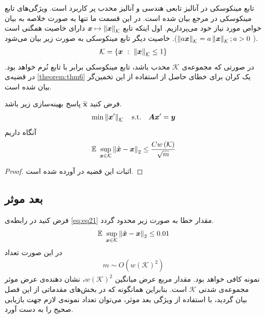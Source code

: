 تابع مینکوسکی در آنالیز تابعی هندسی و آنالیز محدب پر کاربرد است. ویژگی‌های تابع مینکوسکی در مرجع 
\cite{rockafellar1970convex}
بیان شده است. در این قسمت ما تنها به صورت خلاصه به بیان خواص مورد نیاز خود می‌پردازیم. اول اینکه تابع
$\bm{x}\mapsto \left\lVert\bm{x}\right\rVert_{\mathcal{K}}$
دارای خاصیت همگنی است (
$\left\lVert a\bm{x}\right\rVert_{\mathcal{K}} = a \left\lVert\bm{x}\right\rVert_{\mathcal{K}}; a>0$).
خاصیت دیگر تابع مینکوسکی
به صورت زیر بیان می‌شود.
\begin{align}
\label{eq:eq19}
\mathcal{K}= \lbrace \bm{x}~:~ \left\lVert\bm{x}\right\rVert_{\mathcal{K}}\leq 1 \rbrace
\end{align}
در صورتی که مجموعه‌ی
$\mathcal{K}$
محدب باشد، تابع مینکوسکی
برابر با تابع نُرم خواهد بود. در قضیه‌ی
\eqref{theorem:thm6}
یک کران برای خطای حاصل از استفاده از این تخمین‌گر بیان شده است.
\begin{theorem}
\label{theorem:thm6}
\cite[قضیه~ ۴.۲]{vershynin2015estimation}
فرض کنید
$\hat{\bm{x}}$
پاسخ بهینه‌سازی زیر باشد.
\begin{align}
\label{eq:eq20}
\min \left\lVert\bm{x}^{\prime}\right\rVert_{\mathcal{K}} \quad \text{s.t.} \quad \bm{A}\bm{x}^{\prime}= \bm{y}
\end{align}
آنگاه داریم
\begin{align}
\label{eq:eq21}
\mathbb{E}~ \sup_{\bm{x}\in \mathcal{K}} \left\lVert\hat{\bm{x}}-\bm{x}\right\rVert_{2} \leq \dfrac{C w\left(\mathcal{K}\right)}{\sqrt{m}}
\end{align}
\end{theorem}
\begin{proof}
اثبات این قضیه در 
\cite{vershynin2015estimation}
آورده شده است.
\end{proof}

\subsection{بعد موثر}
فرض کنید در رابطه‌ی
\eqref{eq:eq21}
مقدار خطا به صورت زیر محدود گردد.
\begin{align}
\label{eq:eq22}
\mathbb{E}~ \sup_{\bm{x}\in \mathcal{K}} \left\lVert\hat{\bm{x}}-\bm{x}\right\rVert_{2} \leq 0.01
\end{align}
در این صورت تعداد
\begin{align}
\label{eq:eq23}
m \sim O\left( w\left(\mathcal{K} \right)^{2}\right)
\end{align}
نمونه کافی خواهد بود. مقدار مربع عرض میانگین
$w\left(\mathcal{K} \right)^{2}$،
نشان دهنده‌ی عرض موثر مجموعه‌ی شدنی 
$\mathcal{K}$
است. بنابراین همانگونه که در بخش‌های مقدماتی از این فصل بیان گردید، با استفاده از ویژگی بعد موثر، می‌توان تعداد نمونه‌ی لازم جهت بازیابی صحیح را به دست آورد.

